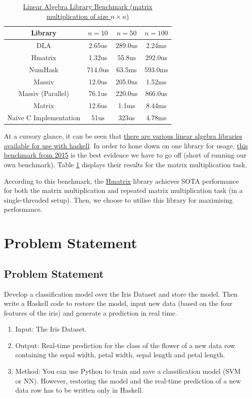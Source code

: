 \documentclass[12pt, titlepage]{article}
\begin{document}
\begin{table}
	\centering \begin{tabular}{|c|c|c|c|}
		\hline \textbf{Library} & $n = 10$ & $n = 50$ & $n = 100$\\
		\hline DLA & 2.65us & 289.0us & 2.24ms\\
		\hline Hmatrix & 1.32us & 55.8us & 292.0us\\
		\hline NumHask & 714.0us & 63.5ms & 593.0ms\\
		\hline Massiv & 12.0us & 205.0us & 1.52ms\\
		\hline Massiv (Parallel) & 76.1us & 220.0us & 866.0us\\
		\hline Matrix & 12.6us & 1.1ms & 8.44ms\\
		\hline Naive C Implementation & 51us & 323us & 4.78ms\\
		\hline
	\end{tabular}
	\caption{\label{tab:1} \href{https://github.com/Magalame/fastest-matrices}{Linear Algebra Library Benchmark (matrix multiplication of size $n \times n$)}}
\end{table}
At a cursory glance, it can be seen that \href{https://wiki.haskell.org/Applications_and_libraries/Mathematics#Linear_algebra}{there are various linear algebra libraries available for use with haskell}. In order to hone down on one library for usage, \href{https://github.com/Magalame/fastest-matrices}{this benchmark from 2015} is the best evidence we have to go off (short of running our own benchmark). Table \ref{tab:1} displays their results for the matrix multiplication task.\bigskip

According to this benchmark, the \href{https://hackage.haskell.org/package/hmatrix}{Hmatrix} library achieves SOTA performance for both the matrix multiplication and repeated matrix multiplication task (in a single-threaded setup). Then, we choose to utilise this library for maximising performance.

\section{Problem Statement}
\subsection{Problem Statement}
Develop a classification model over the Iris Dataset and store the model. Then write a Haskell code to restore the model, input new data (based on the four features of the iris) and generate a prediction in real time.
\begin{enumerate}
	\item Input: The Iris Dataset.
	\item Output: Real-time prediction for the class of the flower of a new data row containing the sepal width, petal width, sepal length and petal length.
	\item Method: You can use Python to train and save a classification model (SVM or NN). However, restoring the model and the real-time prediction of a new data row has to be written only in Haskell.
\end{enumerate}
\end{document}
